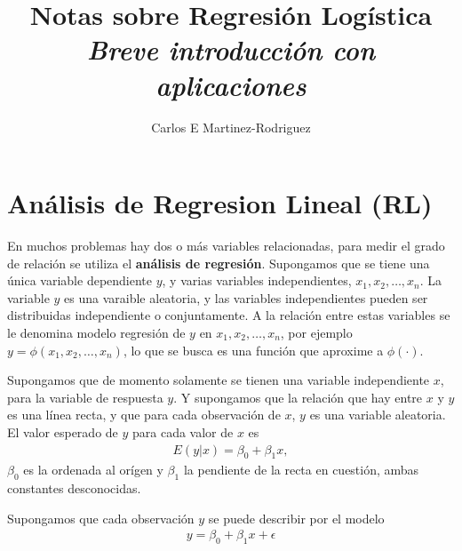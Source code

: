 \documentclass[12pt]{article}
\title{Notas sobre Regresión Logística \\
\textit{Breve introducción con aplicaciones}}
\author{Carlos E Martinez-Rodriguez}
\date{}
\begin{document}
\maketitle
\tableofcontents

\section{An\'alisis de Regresion Lineal (RL)}
En muchos problemas hay dos o m\'as variables relacionadas, para medir el grado de relaci\'on se utiliza el \textbf{an\'alisis de regresi\'on}.  Supongamos que se tiene una \'unica variable dependiente $y$, y varias  variables independientes, $x_{1},x_{2},\ldots,x_{n}$. La variable $y$ es una varaible aleatoria, y las variables independientes pueden ser distribuidas independiente o conjuntamente. A la relaci\'on entre estas variables se le denomina modelo regresi\'on de $y$ en $x_{1},x_{2},\ldots,x_{n}$, por ejemplo $y=\phi\left(x_{1},x_{2},\ldots,x_{n}\right)$, lo que se busca es una funci\'on que aproxime a $\phi\left(\cdot\right)$.
\medskip

Supongamos que de momento solamente se tienen una variable independiente $x$, para la variable de respuesta $y$. Y supongamos que la relaci\'on que hay entre $x$ y $y$ es una l\'inea recta, y que para cada observaci\'on de $x$, $y$ es una variable aleatoria. El valor esperado de $y$ para cada valor de $x$ es
\begin{eqnarray}
E\left(y|x\right)=\beta_{0}+\beta_{1}x,
\end{eqnarray}
$\beta_{0}$ es la ordenada al or\'igen y  $\beta_{1}$ la pendiente de la recta en cuesti\'on, ambas constantes desconocidas. 

Supongamos que cada observaci\'on $y$ se puede describir por el modelo
\begin{eqnarray}\label{Modelo.Regresion}
y=\beta_{0}+\beta_{1}x+\epsilon
\end{eqnarray}
\end{document}
